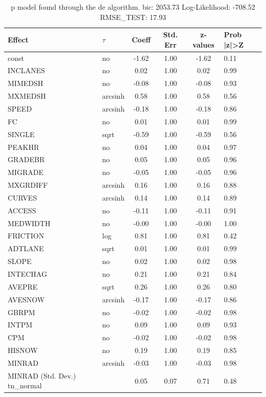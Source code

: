 \begin{table}
	\caption{p model found through the de algorithm. bic: 2053.73 Log-Likelihood: -708.52 RMSE_TEST: 17.93}
	\begin{center}
		\begin{tabular}{|l|l|c|c|c|l|}
			\hline
			Effect & $\tau$ & Coeff & Std. Err & z-values & Prob |z|>Z \\
			\hline
			const & no & -1.62 & 1.00 & -1.62 & 0.11 \\
			\hline
			INCLANES & no & 0.02 & 1.00 & 0.02 & 0.99 \\
			\hline
			MIMEDSH & no & -0.08 & 1.00 & -0.08 & 0.93 \\
			\hline
			MXMEDSH & arcsinh & 0.58 & 1.00 & 0.58 & 0.56 \\
			\hline
			SPEED & arcsinh & -0.18 & 1.00 & -0.18 & 0.86 \\
			\hline
			FC & no & 0.01 & 1.00 & 0.01 & 0.99 \\
			\hline
			SINGLE & sqrt & -0.59 & 1.00 & -0.59 & 0.56 \\
			\hline
			PEAKHR & no & 0.04 & 1.00 & 0.04 & 0.97 \\
			\hline
			GRADEBR & no & 0.05 & 1.00 & 0.05 & 0.96 \\
			\hline
			MIGRADE & no & -0.05 & 1.00 & -0.05 & 0.96 \\
			\hline
			MXGRDIFF & arcsinh & 0.16 & 1.00 & 0.16 & 0.88 \\
			\hline
			CURVES & arcsinh & 0.14 & 1.00 & 0.14 & 0.89 \\
			\hline
			ACCESS & no & -0.11 & 1.00 & -0.11 & 0.91 \\
			\hline
			MEDWIDTH & no & -0.00 & 1.00 & -0.00 & 1.00 \\
			\hline
			FRICTION & log & 0.81 & 1.00 & 0.81 & 0.42 \\
			\hline
			ADTLANE & sqrt & 0.01 & 1.00 & 0.01 & 0.99 \\
			\hline
			SLOPE & no & 0.02 & 1.00 & 0.02 & 0.98 \\
			\hline
			INTECHAG & no & 0.21 & 1.00 & 0.21 & 0.84 \\
			\hline
			AVEPRE & sqrt & 0.26 & 1.00 & 0.26 & 0.80 \\
			\hline
			AVESNOW & arcsinh & -0.17 & 1.00 & -0.17 & 0.86 \\
			\hline
			GBRPM & no & -0.02 & 1.00 & -0.02 & 0.98 \\
			\hline
			INTPM & no & 0.09 & 1.00 & 0.09 & 0.93 \\
			\hline
			CPM & no & -0.02 & 1.00 & -0.02 & 0.98 \\
			\hline
			HISNOW & no & 0.19 & 1.00 & 0.19 & 0.85 \\
			\hline
			MINRAD & arcsinh & -0.03 & 1.00 & -0.03 & 0.98 \\
			\hline
			MINRAD (Std. Dev.) tn_normal &  & 0.05 & 0.07 & 0.71 & 0.48 \\
			\hline
		\end{tabular}
	\end{center}
\end{table}
